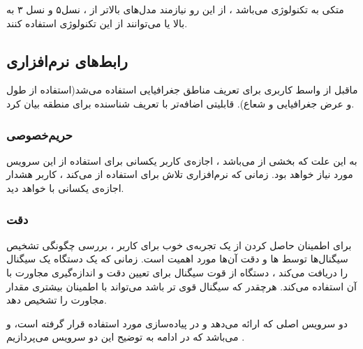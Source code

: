 \documentclass[oneside]{report}
\begin{document}
{\normalsize {}}
متکی به تکنولوژی 
{\normalsize {}} 
می‌باشد ، از این رو نیازمند مدل‌های بالاتر از
{\normalsize {}}
،
{\normalsize {}} 
نسل۵ و 
{\normalsize {}} 
نسل ۳ به بالا
یا 
{\normalsize {}}
می‌توانند از این تکنولوژی استفاده کنند.

\subsection{رابط‌های نرم‌افزاری {\normalsize {}}}
ماقبل 
{\normalsize {}}
از واسط کاربری 
{\normalsize {}}
برای تعریف مناطق جغرافیایی 
	استفاده می‌شد(استفاده از طول و عرض جغرافیایی و شعاع).
	{\normalsize {}}
	قابلیتی اضافه‌تر با تعریف شناسنده برای منطقه بیان کرد. 
	\subsubsection{ حریم‌خصوصی  }
	به این علت که 
	{\normalsize {}}
	بخشی از 
	{\normalsize {}}
	می‌باشد ، اجازه‌ی کاربر یکسانی برای استفاده از این سرویس مورد نیاز خواهد بود. زمانی که نرم‌افزاری تلاش برای استفاده از 
	{\normalsize {}}
	می‌کند ، کاربر هشدار اجازه‌ی یکسانی با 
	{\normalsize {}}
	خواهد دید. 
	
\subsubsection{دقت {\small {}}}
برای اطمینان حاصل کردن از یک تجربه‌ی خوب برای کاربر ، بررسی چگونگی تشخیص سیگنال‌ها توسط 
{\normalsize {}} ها 
و دقت آن‌ها مورد اهمیت است. زمانی که یک دستگاه 
{\normalsize {}}
یک سیگنال 
{\normalsize {}}
را دریافت می‌کند ، دستگاه از قوت سیگنال برای تعیین دقت و اندازه‌گیری مجاورت با آن استفاده می‌کند. هرچقدر که سیگنال قوی تر باشد 
{\normalsize {}}
می‌تواند با اطمینان بیشتری مقدار مجاورت را تشخیص دهد. 

دو سرویس اصلی که 
{\normalsize {}}
 ارائه می‌دهد  و در پیاده‌سازی مورد استفاده قرار گرفته است،
  {\normalsize {}} 
 و
  {\normalsize {}}
  می‌باشد که در ادامه به توضیح این دو سرویس می‌پردازیم .
\end{document}
